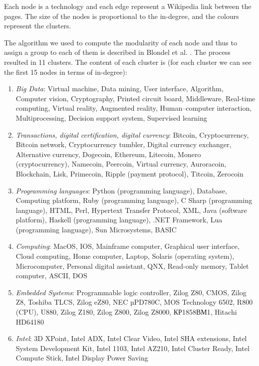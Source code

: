 \documentclass[]{book}
\begin{document}
Each node is a technology and each edge represent a Wikipedia link
between the pages. The size of the nodes is proportional to the
in-degree, and the colours represent the clusters.

The algorithm we used to compute the modularity of each node and thus to
assign a group to each of them is described in Blondel et al.
\citep{blondel2008fast}. The process resulted in 11 clusters. The
content of each cluster is (for each cluster we can see the first 15
nodes in terms of in-degree):

\begin{enumerate}
\def\labelenumi{\arabic{enumi}.}
\item
  \emph{Big Data}: Virtual machine, Data mining, User interface,
  Algorithm, Computer vision, Cryptography, Printed circuit board,
  Middleware, Real-time computing, Virtual reality, Augmented reality,
  Human--computer interaction, Multiprocessing, Decision support system,
  Supervised learning
\item
  \emph{Transactions, digital certification, digital currency}: Bitcoin,
  Cryptocurrency, Bitcoin network, Cryptocurrency tumbler, Digital
  currency exchanger, Alternative currency, Dogecoin, Ethereum,
  Litecoin, Monero (cryptocurrency), Namecoin, Peercoin, Virtual
  currency, Auroracoin, Blockchain, Lisk, Primecoin, Ripple (payment
  protocol), Titcoin, Zerocoin
\item
  \emph{Programming languages}: Python (programming language), Database,
  Computing platform, Ruby (programming language), C Sharp (programming
  language), HTML, Perl, Hypertext Transfer Protocol, XML, Java
  (software platform), Haskell (programming language), .NET Framework,
  Lua (programming language), Sun Microsystems, BASIC
\item
  \emph{Computing}: MacOS, IOS, Mainframe computer, Graphical user
  interface, Cloud computing, Home computer, Laptop, Solaris (operating
  system), Microcomputer, Personal digital assistant, QNX, Read-only
  memory, Tablet computer, ASCII, DOS
\item
  \emph{Embedded Systems}: Programmable logic controller, Zilog Z80,
  CMOS, Zilog Z8, Toshiba TLCS, Zilog eZ80, NEC µPD780C, MOS Technology
  6502, R800 (CPU), U880, Zilog Z180, Zilog Z800, Zilog Z8000,
  КР1858ВМ1, Hitachi HD64180
\item
  \emph{Intel}: 3D XPoint, Intel ADX, Intel Clear Video, Intel SHA
  extensions, Intel System Development Kit, Intel 1103, Intel AZ210,
  Intel Cluster Ready, Intel Compute Stick, Intel Display Power Saving

\end{enumerate}
\end{document}
